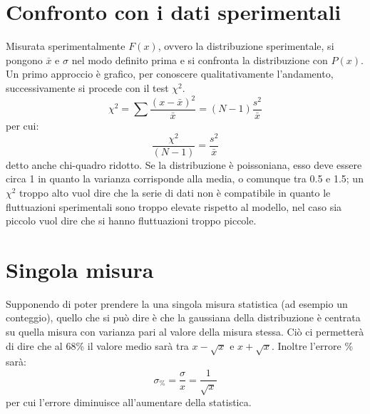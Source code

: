 \section{Confronto con i dati sperimentali}
Misurata sperimentalmente $F(x)$, ovvero la distribuzione sperimentale, si pongono $\bar{x}$ e $\sigma$ nel modo definito prima e si confronta
la distribuzione con $P(x)$. 
Un primo approccio \`e grafico, per conoscere qualitativamente l'andamento, successivamente si procede con il test $\chi^2$.
\begin{equation*}
\chi^2 = \sum \frac{(x-\bar{x})^2}{\bar{x}} = (N-1)\frac{s^2}{\bar{x}}
\end{equation*}
per cui:
\begin{equation*}
\frac{\chi^2}{(N-1)} = \frac{s^2}{\bar{x}}
\end{equation*}
detto anche chi-quadro ridotto.
Se la distribuzione \`e poissoniana, esso deve essere circa 1 in quanto la varianza corrisponde alla media, o comunque tra 0.5 e 1.5; un $\chi^2$ troppo alto vuol dire che la serie di dati non \`e compatibile in quanto le
fluttuazioni sperimentali sono troppo elevate rispetto al modello, nel caso sia piccolo vuol dire che si hanno fluttuazioni troppo piccole.
\section{Singola misura}
Supponendo di poter prendere la una singola misura statistica (ad esempio un conteggio), quello che si pu\`o dire \`e che la gaussiana della distribuzione \`e centrata
su quella misura con varianza pari al valore della misura stessa. 
Ci\`o ci permetter\`a di dire che al 68\% il valore medio sar\`a tra $x-\sqrt{x}$ e $x+\sqrt{x}$.
Inoltre l'errore \% sar\`a:
\begin{equation*}
\sigma_{\%} = \frac{\sigma}{x} = \frac{1}{\sqrt{x}}
\end{equation*}
per cui l'errore diminuisce all'aumentare della statistica.
